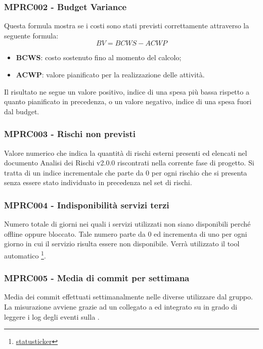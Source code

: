 {\subsubsection{MPRC002 - Budget Variance}
Questa formula mostra se i costi sono stati previsti correttamente attraverso la seguente formula:
\begin{displaymath}
    BV = BCWS - ACWP
\end{displaymath}
\begin{itemize}
    \item \textbf{BCWS}: costo sostenuto fino al momento del calcolo;
    \item \textbf{ACWP}: valore pianificato per la realizzazione delle attività.
\end{itemize}
Il risultato ne segue un valore positivo, indice di una spesa più bassa rispetto a quanto pianificato in precedenza, o un valore negativo, indice di una spesa fuori dal budget.

\subsubsection{MPRC003 - Rischi non previsti}
Valore numerico che indica la quantità di rischi esterni presenti ed elencati nel documento Analisi dei Rischi v2.0.0 riscontrati nella corrente fase di progetto. Si tratta di un indice incrementale che parte da 0 per ogni rischio che si presenta senza essere stato individuato in precedenza nel set di rischi.
\subsubsection{MPRC004 - Indisponibilità servizi terzi}
Numero totale di giorni nei quali i servizi utilizzati non siano disponibili perché offline oppure bloccato. Tale numero parte da 0 ed incrementa di uno per ogni giorno in cui il servizio risulta essere non disponibile. Verrà utilizzato il tool automatico \footnote{\href{https://statusticker.com/}{statusticker}}.
\subsubsection{MPRC005 - Media di commit per settimana}
Media dei commit effettuati settimanalmente nelle diverse  utilizzare dal gruppo. La misurazione avviene grazie ad un  collegato a  ed integrato su  in grado di leggere i log degli eventi sulla .
}
